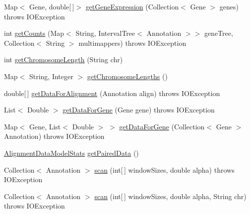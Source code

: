 \begin{DoxyCompactItemize}
\item 
Map$<$ Gene, double\mbox{[}$\,$\mbox{]}$>$ \hyperlink{classbroad_1_1pda_1_1seq_1_1segmentation_1_1_continuous_data_alignment_model_aef09a54b699b7e8130f80515431e250c}{get\+Gene\+Expression} (Collection$<$ Gene $>$ genes)  throws I\+O\+Exception
\item 
int \hyperlink{classbroad_1_1pda_1_1seq_1_1segmentation_1_1_continuous_data_alignment_model_a24fc6c0cea13276596ad51dbab778d38}{get\+Counts} (Map$<$ String, Interval\+Tree$<$ Annotation $>$$>$ gene\+Tree, Collection$<$ String $>$ multimappers)  throws I\+O\+Exception
\item 
int \hyperlink{classbroad_1_1pda_1_1seq_1_1segmentation_1_1_continuous_data_alignment_model_aadb1c1dfc12a73268e0552fb99e01024}{get\+Chromosome\+Length} (String chr)
\item 
Map$<$ String, Integer $>$ \hyperlink{classbroad_1_1pda_1_1seq_1_1segmentation_1_1_continuous_data_alignment_model_af1b3646c528368d2b2af71fb820350a6}{get\+Chromosome\+Lengths} ()
\item 
double\mbox{[}$\,$\mbox{]} \hyperlink{classbroad_1_1pda_1_1seq_1_1segmentation_1_1_continuous_data_alignment_model_af7d90fa931951069416e3ad235e99f37}{get\+Data\+For\+Alignment} (Annotation align)  throws I\+O\+Exception
\item 
List$<$ Double $>$ \hyperlink{classbroad_1_1pda_1_1seq_1_1segmentation_1_1_continuous_data_alignment_model_a00cf5fa4275d363fa77bf05454e7909c}{get\+Data\+For\+Gene} (Gene gene)  throws I\+O\+Exception
\item 
Map$<$ Gene, List$<$ Double $>$ $>$ \hyperlink{classbroad_1_1pda_1_1seq_1_1segmentation_1_1_continuous_data_alignment_model_a0a1e9f474a59ee99a9c548092d35bf5b}{get\+Data\+For\+Gene} (Collection$<$ Gene $>$ Annotation)  throws I\+O\+Exception
\item 
\hyperlink{classbroad_1_1pda_1_1seq_1_1segmentation_1_1_alignment_data_model_stats}{Alignment\+Data\+Model\+Stats} \hyperlink{classbroad_1_1pda_1_1seq_1_1segmentation_1_1_continuous_data_alignment_model_a1db375ffca9153b8143df70c0bece395}{get\+Paired\+Data} ()
\item 
Collection$<$ Annotation $>$ \hyperlink{classbroad_1_1pda_1_1seq_1_1segmentation_1_1_continuous_data_alignment_model_a9055da2c6c85869da10e9bff9c0fbac9}{scan} (int\mbox{[}$\,$\mbox{]} window\+Sizes, double alpha)  throws I\+O\+Exception
\item 
Collection$<$ Annotation $>$ \hyperlink{classbroad_1_1pda_1_1seq_1_1segmentation_1_1_continuous_data_alignment_model_a854b44de12136762faa57412f7b47465}{scan} (int\mbox{[}$\,$\mbox{]} window\+Sizes, double alpha, String chr)  throws I\+O\+Exception
$$
\end{DoxyCompactItemize}
